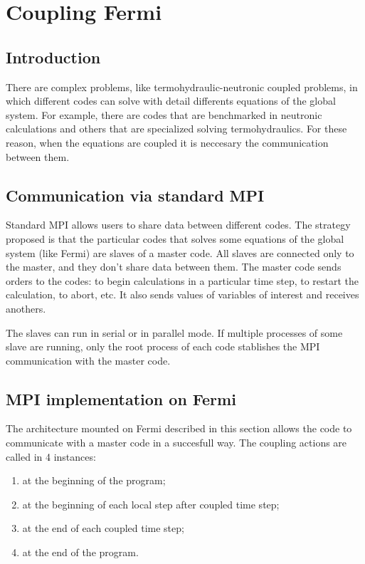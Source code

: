 \chapter{Coupling Fermi}

\section{Introduction}

There are complex problems, like termohydraulic-neutronic coupled problems, in which different codes can solve with detail differents equations of the global system.
For example, there are codes that are benchmarked in neutronic calculations and others that are specialized solving termohydraulics.
For these reason, when the equations are coupled it is neccesary the communication between them.

\section{Communication via standard MPI}

Standard MPI allows users to share data between different codes.
The strategy proposed is that the particular codes that solves some equations of the global system (like Fermi) are slaves of a master code.
All slaves are connected only to the master, and they don't share data between them.
The master code sends orders to the codes: to begin calculations in a particular time step, to restart the calculation, to abort, etc.
It also sends values of variables of interest and receives anothers.

The slaves can run in serial or in parallel mode.
If multiple processes of some slave are running, only the root process of each code stablishes the MPI communication with the master code.

\section{MPI implementation on Fermi}

The architecture mounted on Fermi described in this section allows the code to communicate with a master code in a succesfull way.
The coupling actions are called in 4 instances:
\begin{enumerate}
\item at the beginning of the program;
\item at the beginning of each local step after coupled time step;
\item at the end of each coupled time step;
\item at the end of the program.
\end{enumerate}

